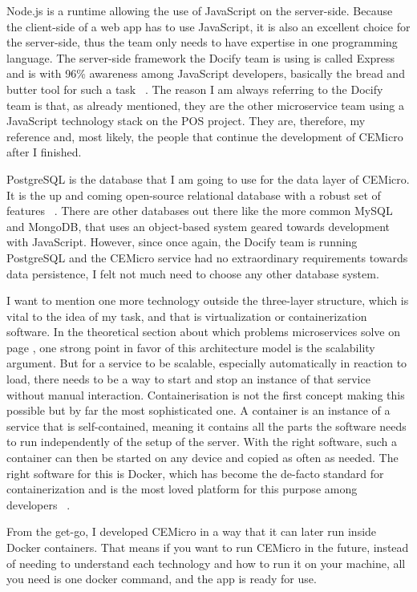 Node.js is a runtime allowing the use of JavaScript on the server-side. Because the client-side of a web app has to use JavaScript, it is also an excellent choice for the server-side, thus the team only needs to have expertise in one programming language. The server-side framework the Docify team is using is called Express and is with 96\% awareness among JavaScript developers, basically the bread and butter tool for such a task ~\cite{stateofjs.2019}. The reason I am always referring to the Docify team is that, as already mentioned, they are the other microservice team using a JavaScript technology stack on the POS project. They are, therefore, my reference and, most likely, the people that continue the development of CEMicro after I finished.

PostgreSQL is the database that I am going to use for the data layer of CEMicro. It is the up and coming open-source relational database with a robust set of features ~\cite{stackoverflow.2019}. There are other databases out there like the more common MySQL and MongoDB, that uses an object-based system geared towards development with JavaScript. However, since once again, the Docify team is running PostgreSQL and the CEMicro service had no extraordinary requirements towards data persistence, I felt not much need to choose any other database system.

I want to mention one more technology outside the three-layer structure, which is vital to the idea of my task, and that is virtualization or containerization software. In the theoretical section about which problems microservices solve on page \pageref{sec:theory:what-problem}, one strong point in favor of this architecture model is the scalability argument. But for a service to be scalable, especially automatically in reaction to load, there needs to be a way to start and stop an instance of that service without manual interaction. Containerisation is not the first concept making this possible but by far the most sophisticated one. A container is an instance of a service that is self-contained, meaning it contains all the parts the software needs to run independently of the setup of the server. With the right software, such a container can then be started on any device and copied as often as needed. The right software for this is Docker, which has become the de-facto standard for containerization and is the most loved platform for this purpose among developers ~\cite{stackoverflow.2019}.

From the get-go, I developed CEMicro in a way that it can later run inside Docker containers. That means if you want to run CEMicro in the future, instead of needing to understand each technology and how to run it on your machine, all you need is one docker command, and the app is ready for use.


